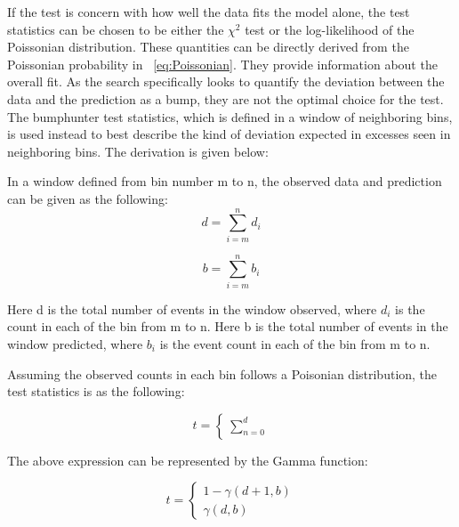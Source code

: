 If the test is concern with how well the data fits the model alone, the test statistics can be chosen to be either the $\chi^{2}$ test or the log-likelihood of the Poissonian distribution. These quantities can be directly derived from the Poissonian probability in ~\ref{eq:Poissonian}. They provide information about the overall fit. As the search specifically looks to quantify the deviation between the data and the prediction as a bump, they are not the optimal choice for the test. 
The bumphunter test statistics, which is defined in a window of neighboring bins, is used instead to best describe the kind of deviation expected in excesses seen in neighboring bins. The derivation is given below: 

In a window defined from bin number m to n, the observed data and prediction can be given as the following: 
    \begin{equation}
         d= \sum_{i=m}^{n} d_i 
    \end{equation}

    
    \begin{equation}
         b= \sum_{i=m}^{n} b_i
    \end{equation}

    Here d is the total number of events in the window observed, where $d_i$ is the count in each of the bin from m to n. 
    Here b is the total number of events in the window predicted, where $b_i$ is the event count in each of the bin from m to n.
    
    Assuming the observed counts in each bin follows a Poisonian distribution, the test statistics is as the following:

	\begin{equation}
    t=
	\begin{cases} \sum_{n=0}^{d} %
    \end{cases}
    \end{equation}

    The above expression can be represented by the Gamma function: 

	\begin{equation}
    t=
	\begin{cases} 1-\gamma(d+1, b)%
    \\
    \gamma(d,b)%
    \end{cases}
    \end{equation}
    


